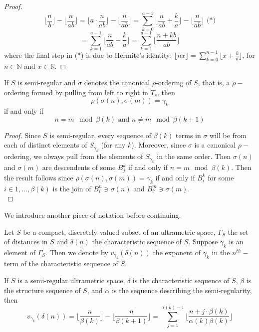 \begin{proof}
\[\lfloor\frac{n}{b} \rfloor - \lfloor \frac{n}{ab} \rfloor = \lfloor a \cdot \frac{n}{ab} \rfloor - \lfloor \frac{n}{ab} \rfloor  = \sum_{k=0}^{a-1} \lfloor \frac{n}{ab} + \frac{k}{a} \rfloor - \lfloor \frac{n}{ab} \rfloor \text{ (*)}\]
\[= \sum_{k=1}^{a-1} \lfloor \frac{n}{ab} + \frac{k}{a} \rfloor = \sum_{k=1}^{a-1} \lfloor \frac{n + kb}{ab} \rfloor \]
where the final step in (*) is due to Hermite's identity: $\lfloor nx \rfloor = \sum_{k=0}^{n-1} \lfloor x + \frac{k}{n} \rfloor$, for $n \in \mathbb{N}$ and $x \in \mathbb{R}$.
\end{proof}                                                                                                              

\begin{lemma}
If $S$ is semi-regular and $\sigma$ denotes the canonical $\rho$-ordering of $S$, that is, a $\rho-$ordering formed by pulling from left to right in $T_s$, then \[\rho(\sigma(n),\sigma(m))=\gamma_k\] if and only if \[ n=m \mod \beta(k) \text{  and } n \neq m \mod \beta(k+1)\]
\end{lemma}

\begin{proof}
Since $S$ is semi-regular, every sequence of $\beta(k)$ terms in $\sigma$ will be from each of distinct elements of $S_{\gamma_k}$ (for any $k$). Moreover, since $\sigma$ is a canonical $\rho-$ordering, we always pull from the elements of $S_{\gamma_k}$ in the same order. Then $\sigma(n)$ and $\sigma(m)$ are descendents of some $B^k_j$ if and only if $n = m \mod \beta(k)$. Then the result follows since $\rho(\sigma(n),\sigma(m))=\gamma_k$ if and only if $B^k_i$ for some $i \in 1,\ldots, \beta(k)$ is the join of $B^n_i \ni \sigma(n)$ and $B^m_{i'} \ni \sigma(m)$.  \\ 
\end{proof}

We introduce another piece of notation before continuing.

\begin{notation}
	Let $S$ be a compact, discretely-valued subset of an ultrametric space, $\Gamma_S$ the set of distances in $S$ and $\delta(n)$ the characteristic sequence of $S$. Suppose $\gamma_k$ is an element of $\Gamma_S$. Then we denote by $v_{\gamma_k}(\delta(n))$ the exponent of $\gamma_k$ in the $n^{th}-$term of the characteristic sequence of $S$.
\end{notation}

\begin{proposition}
If $S$ is a semi-regular ultrametric space, $\delta$ is the characteristic sequence of $S$, $\beta$ is the structure sequence of $S$, and $\alpha$ is the sequence describing the semi-regularity, then
\[v_{\gamma_k}(\delta(n)) =  \lfloor\frac{n}{\beta(k)}\rfloor - \lfloor\frac{n}{\beta(k+1)}\rfloor = \sum_{j=1}^{\alpha(k)-1} \lfloor \frac{n + j\cdot \beta(k)}{\alpha(k)\beta(k)} \rfloor\]
\end{proposition}


